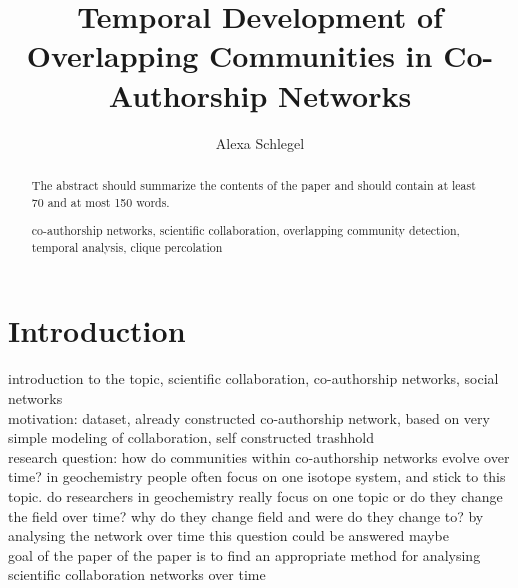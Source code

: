 \documentclass[runningheads,a4paper]{llncs}
\newcommand{\keywords}[1]{\par\addvspace\baselineskip
\noindent\keywordname\enspace\ignorespaces#1}
\begin{document}
\mainmatter  %

\title{Temporal Development of Overlapping Communities in Co-Authorship Networks}


%
%
\author{Alexa Schlegel%
}
%


%
%

\maketitle


\begin{abstract}
The abstract should summarize the contents of the paper and should
contain at least 70 and at most 150 words.
\keywords{co-authorship networks, scientific collaboration, overlapping community detection, temporal analysis, clique percolation}
\end{abstract}

\section{Introduction}
introduction to the topic, scientific collaboration, co-authorship networks, social networks\\
motivation: dataset, already constructed co-authorship network, based on very simple modeling of collaboration, self constructed trashhold\\
research question: how do communities within co-authorship networks evolve over time? in geochemistry people often focus on one isotope system, and stick to this topic. do researchers in geochemistry really focus on one topic or do they change the field over time? why do they change field and were do they change to? by analysing the network over time this question could be answered maybe\\
goal of the paper of the paper is to find an appropriate method for analysing scientific collaboration networks over time\\
\end{document}
